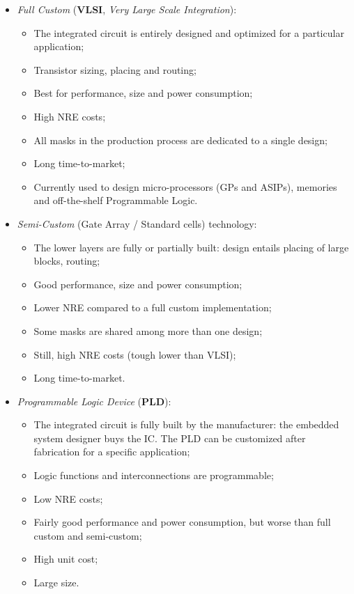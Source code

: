 \documentclass[a4paper,11pt]{article}
\begin{document}
\begin{itemize}
	\item
	      \textit{Full Custom} (\textbf{VLSI}, \textit{Very Large Scale Integration}):
	      \begin{itemize}
		      \item The integrated circuit is entirely designed and optimized for a particular application;
		      \item Transistor sizing, placing and routing;
		      \item Best for performance, size and power consumption;
		      \item High NRE costs;
		      \item All masks in the production process are dedicated to a single design;
		      \item Long time-to-market;
		      \item Currently used to design micro-processors (GPs and ASIPs), memories and off-the-shelf Programmable Logic.
	      \end{itemize}

	\item
	      \textit{Semi-Custom} (Gate Array / Standard cells) technology:
	      \begin{itemize}
		      \item The lower layers are fully or partially built: design entails placing of large blocks, routing;
		      \item Good performance, size and power consumption;
		      \item Lower NRE compared to a full custom implementation;
		      \item Some masks are shared among more than one design;
		      \item Still, high NRE costs (tough lower than VLSI);
		      \item Long time-to-market.
	      \end{itemize}

	\item
	      \textit{Programmable Logic Device} (\textbf{PLD}):
	      \begin{itemize}
		      \item The integrated circuit is fully built by the manufacturer: the embedded system designer buys the IC. The PLD can be customized after fabrication for a specific application;
		      \item Logic functions and interconnections are programmable;
		      \item Low NRE costs;
		      \item Fairly good performance and power consumption, but worse than full custom and semi-custom;
		      \item High unit cost;
		      \item Large size.
	      \end{itemize}
\end{itemize}
\end{document}
